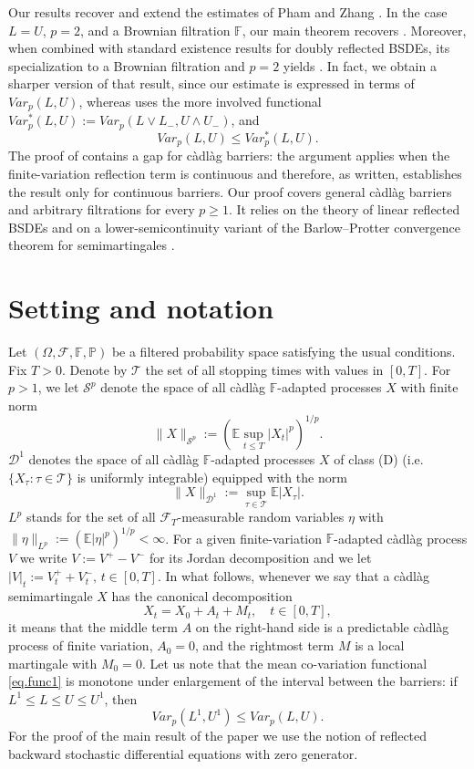 \documentclass[11pt,a4paper,reqno]{amsart}
\theoremstyle{definition}
\numberwithin{equation}{section}
\begin{document}
Our results recover and extend the estimates of Pham and Zhang \cite{PZ}.
In the case $L=U$, $p=2$, and a Brownian filtration $\mathbb F$, 
our main theorem recovers \cite[Theorems 2.6 and 2.7]{PZ}. Moreover, when combined with
standard existence results for doubly reflected BSDEs, its specialization
to a Brownian filtration and $p=2$ yields \cite[Theorem 3.4]{PZ}. In fact,
we obtain a sharper version of that result, since our estimate is expressed
in terms of $Var_p(L,U)$, whereas \cite{PZ} uses the more involved
functional $Var_p^*(L,U):=Var_p(L\vee L_-,U\wedge U_-)$, and
\[
Var_p(L,U)\leq Var_p^*(L,U).
\]
The proof of \cite[Theorem 3.4]{PZ} contains a gap for c\`adl\`ag barriers:
the argument applies when the finite-variation reflection term is
continuous and therefore, as written, establishes the result only for
continuous barriers. 
Our proof covers general c\`adl\`ag barriers and arbitrary filtrations for
every $p\geq1$. It relies on the theory of linear reflected BSDEs and on a 
lower-semicontinuity variant of the Barlow–Protter convergence theorem for semimartingales \cite{BarlowProtter1990}.


\section{Setting and notation}\label{sec.setting.var}

Let $(\Omega,\mathcal F,\mathbb F,\mathbb P)$ be a  filtered probability space  
satisfying the usual conditions.  Fix $T>0$.  Denote by
$\mathcal T$ the set of all stopping times with values in $[0,T]$.  
For $p>1$, we let $\mathcal S^p$ denote the space of all c\`adl\`ag $\mathbb F$-adapted processes
$X$ with finite norm 
\[
\|X\|_{\mathcal S^p}:=\left(\mathbb E\sup_{t\le T}|X_t|^p\right)^{1/p}.
\]
$\mathcal D^1$ denotes the space of all c\`adl\`ag $\mathbb F$-adapted processes
$X$ of class (D) (i.e. $\{X_\tau:\tau\in\mathcal T\}$ is uniformly integrable) equipped with the  norm 
\[
\|X\|_{\mathcal D^1}:=\sup_{\tau\in\mathcal T}\mathbb E|X_\tau|.
\]
$L^p$ stands for the set of all $\mathcal F_T$-measurable random variables $\eta$
with  $\|\eta\|_{L^p}:= (\mathbb E|\eta|^p)^{1/p}<\infty$.  For a given finite-variation $\mathbb F$-adapted c\`adl\`ag
process $V$ we write $V:=V^+-V^-$ for  its Jordan decomposition and we let $|V|_t:=V^+_t+V^-_t,\, t\in [0,T]$.
In what follows, whenever we say that  a  c\`adl\`ag semimartingale  $X$ has the  canonical decomposition 
\begin{equation}
\label{eq.semcd}
X_t=X_0+A_t+M_t,\quad t\in [0,T],
\end{equation}
it means that the middle term $A$ on the right-hand side  is a predictable c\`adl\`ag  
 process of finite variation, $A_0=0$, and the rightmost term $M$ is a local 
martingale with $M_0=0$. 
Let us note that the  mean co-variation  functional \eqref{eq.func1} is monotone under enlargement of the 
interval between the barriers: if $L^1\le L\le U\le U^1$, then
\begin{equation}\label{eq.varmon}
Var_p(L^1,U^1)\le Var_p(L,U).
\end{equation}
For the proof of the main result of the paper we use the notion of  reflected backward stochastic differential equations
with zero generator. 
\end{document}
